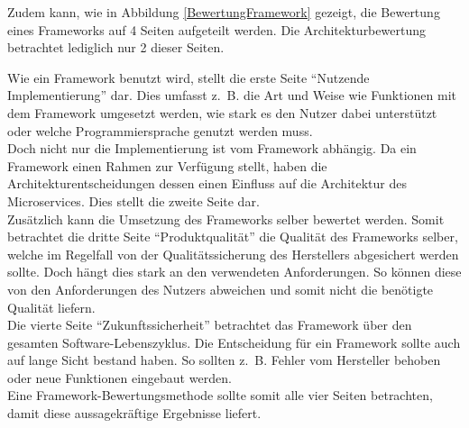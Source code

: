 Zudem kann, wie in Abbildung \ref{BewertungFramework} gezeigt, die Bewertung eines Frameworks auf 4 Seiten aufgeteilt werden. Die Architekturbewertung betrachtet lediglich nur 2 dieser Seiten.


Wie ein Framework benutzt wird, stellt die erste Seite \enquote{Nutzende Implementierung} dar. Dies umfasst z.~B. die Art und Weise wie Funktionen mit dem Framework umgesetzt werden, wie stark es den Nutzer dabei unterstützt oder welche Programmiersprache genutzt werden muss.\\
Doch nicht nur die Implementierung ist vom Framework abhängig. Da ein Framework einen Rahmen zur Verfügung stellt, haben die Architekturentscheidungen dessen einen Einfluss auf die Architektur des Microservices. Dies stellt die zweite Seite dar.\\
Zusätzlich kann die Umsetzung des Frameworks selber bewertet werden. Somit betrachtet die dritte Seite \enquote{Produktqualität} die Qualität des Frameworks selber, welche im Regelfall von der Qualitätssicherung des Herstellers abgesichert werden sollte. Doch hängt dies stark an den verwendeten Anforderungen. So können diese von den Anforderungen des Nutzers abweichen und somit nicht die benötigte Qualität liefern.\\
Die vierte Seite \enquote{Zukunftssicherheit} betrachtet das Framework über den gesamten Software-Lebenszyklus. Die Entscheidung für ein Framework sollte auch auf lange Sicht bestand haben. So sollten z.~B. Fehler vom Hersteller behoben oder neue Funktionen eingebaut werden.\\

Eine Framework-Bewertungsmethode sollte somit alle vier Seiten betrachten, damit diese aussagekräftige Ergebnisse liefert. 




